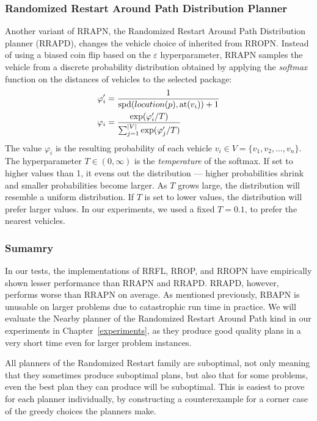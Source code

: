 \subsubsection{Randomized Restart Around Path Distribution Planner}\label{rrapd}

Another variant of RRAPN, the
Randomized Restart Around Path Distribution planner (RRAPD),
changes the vehicle choice of inherited from RROPN.
Instead of using a biased coin flip based on the $\varepsilon$
hyperparameter, RRAPN samples the vehicle
from a discrete probability distribution
obtained by applying the \textit{softmax} function on the distances of vehicles to the selected package:
\begin{align*}
\varphi'_i &= \frac{1}{\textrm{spd}(location(p), \textrm{at}(v_i)) + 1}\\
\varphi_i &= \frac{\exp(\varphi'_i/T)}{\sum_{j = 1}^{|V|} \exp(\varphi'_j/T)}
\end{align*}
The value $\varphi_i$ is the resulting probability of each vehicle $v_i \in V = \{v_1, v_2, \ldots, v_n\}$.
The hyperparameter $T \in (0, \infty)$ is the \textit{temperature}
of the softmax. If set to higher values than 1, it
evens out the distribution --- higher probabilities shrink
and smaller probabilities become larger.
As $T$ grows large, the distribution will resemble a uniform distribution.
If $T$ is set to lower values, the distribution will prefer larger values.
In our experiments, we used a fixed $T = 0.1$, to prefer the nearest vehicles.

\subsubsection{Sumamry}

In our tests, the implementations
of RRFL, RROP, and RROPN have empirically shown
lesser performance than RRAPN and RRAPD.
RRAPD, however, performs worse than RRAPN on
average.
As mentioned previously, RBAPN is unusable on larger
problems due to catastrophic run time in practice.
We will evaluate the Nearby planner
of the Randomized Restart Around Path
kind in our experiments in Chapter~\ref{experiments},
as they produce good quality plans in a very short time
even for larger problem instances.

All planners of the Randomized Restart family
are suboptimal, not only meaning that they sometimes produce
suboptimal plans, but also that for some problems,
even the best plan they can produce will be suboptimal.
This is easiest to prove for each planner individually,
by constructing a counterexample for a corner
case of the 
greedy
choices
the planners make.



























